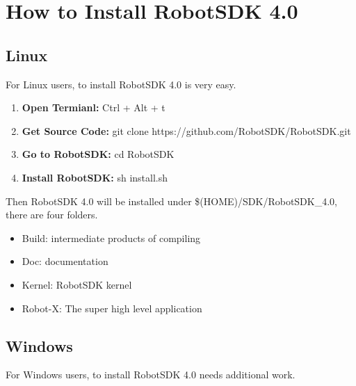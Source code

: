 \documentclass[a4paper,10pt]{book}
\begin{document}
\section{How to Install RobotSDK 4.0}

\subsection{Linux}

For Linux users, to install RobotSDK 4.0 is very easy.

\begin{enumerate}
 \item {\bf{Open Termianl:}} Ctrl + Alt + t
 \item {\bf{Get Source Code:}} git clone https://github.com/RobotSDK/RobotSDK.git
 \item {\bf{Go to RobotSDK:}} cd RobotSDK
 \item {\bf{Install RobotSDK:}} sh install.sh
\end{enumerate}

Then RobotSDK 4.0 will be installed under \$(HOME)/SDK/RobotSDK\_4.0, there are four folders.

\begin{itemize}
 \item Build: intermediate products of compiling
 \item Doc: documentation
 \item Kernel: RobotSDK kernel
 \item Robot-X: The super high level application
\end{itemize}

\subsection{Windows}

For Windows users, to install RobotSDK 4.0 needs additional work.
\end{document}

